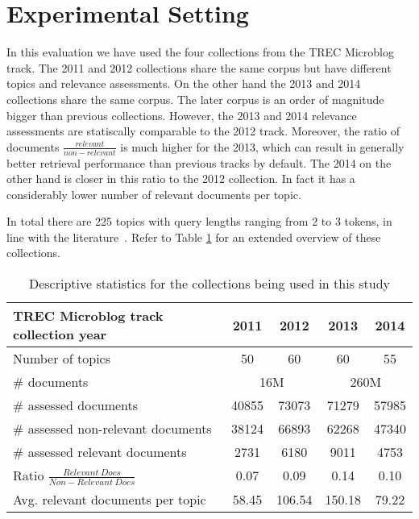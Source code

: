 \section{Experimental Setting}
\label{experiment}

 In this evaluation we have used the four collections from the TREC Microblog track. The 2011 and 2012 collections share the same corpus but have different topics and relevance assessments. On the other hand the 2013 and 2014 collections share the same corpus. The later corpus is an order of magnitude bigger than previous collections. However, the 2013 and 2014 relevance assessments are statiscally comparable to the 2012 track. Moreover, the ratio of documents \(\frac{relevant}{non-relevant}\) is much higher for the 2013, which can result in generally better retrieval performance than previous tracks by default. The 2014 on the other hand is closer in this ratio to the 2012 collection. In fact it has a considerably lower number of relevant documents per topic.

In total there are 225 topics with query lengths ranging from 2 to 3 tokens, in line with the literature~\cite{teevan2011twittersearch}. Refer to Table \ref{collections} for an extended overview of these collections. \\




\begin{table}[]
\caption{Descriptive statistics for the collections being used in this study}
  	\centering
   \begin{tabular}{l||c|c|c|c} 
    \hline
	TREC Microblog track collection year & 2011 & 2012 & 2013 & 2014 \tabularnewline
	\hline
	Number of topics   & 50 & 60 & 60 & 55 \tabularnewline
    \hline
	\# documents & \multicolumn{2}{c|}{16M} & \multicolumn{2}{c}{260M}  \tabularnewline
    \hline
	\# assessed documents   & 40855 &  73073  & 71279 & 57985 \tabularnewline
    \hline
	\# assessed non-relevant documents & 38124 & 66893 & 62268 & 47340 \tabularnewline
	\hline
	\# assessed relevant documents  & 2731 &  6180 & 9011 & 4753\tabularnewline
	\hline
	Ratio \(\frac{Relevant~Docs}{Non-Relevant~Docs}\) & 0.07 &  0.09 & 0.14 & 0.10\tabularnewline
	\hline
	Avg. relevant documents per topic   & 58.45 &  106.54 & 150.18 & 79.22 \tabularnewline
	\hline
   \end{tabular}
   \label{collections}
   \vspace{0.5cm}
\end{table}

